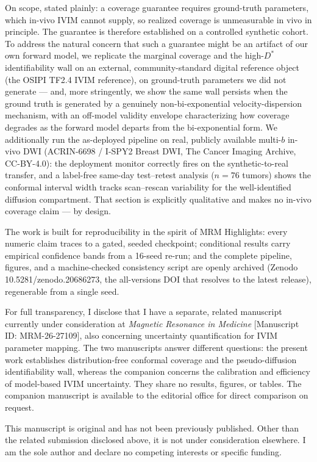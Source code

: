 \documentclass[11pt]{article}
\newcommand{\Dstar}{D^{*}}
\begin{document}
On scope, stated plainly: a coverage guarantee requires ground-truth parameters,
which in-vivo IVIM cannot supply, so realized coverage is unmeasurable in vivo in
principle. The guarantee is therefore established on a controlled synthetic cohort.
To address the natural concern that such a guarantee might be an artifact of our own
forward model, we replicate the marginal coverage and the high-$\Dstar$
identifiability wall on an external, community-standard digital reference object
(the OSIPI TF2.4 IVIM reference), on ground-truth parameters we did not generate ---
and, more stringently, we show the same wall persists when the ground truth is
generated by a genuinely non-bi-exponential velocity-dispersion mechanism, with an
off-model validity envelope characterizing how coverage degrades as the forward
model departs from the bi-exponential form. We additionally run the as-deployed
pipeline on real, publicly available multi-$b$ in-vivo DWI (ACRIN-6698 / I-SPY2
Breast DWI, The Cancer Imaging Archive, CC-BY-4.0): the deployment monitor correctly
fires on the synthetic-to-real transfer, and a label-free same-day test--retest
analysis ($n = 76$ tumors) shows the conformal interval width tracks scan--rescan
variability for the well-identified diffusion compartment. That section is
explicitly qualitative and makes no in-vivo coverage claim --- by design.

The work is built for reproducibility in the spirit of MRM Highlights: every numeric
claim traces to a gated, seeded checkpoint; conditional results carry empirical
confidence bands from a 16-seed re-run; and the complete pipeline, figures, and a
machine-checked consistency script are openly archived (Zenodo
10.5281/zenodo.20686273, the all-versions DOI that resolves to the latest
release), regenerable from a single seed.

For full transparency, I disclose that I have a separate, related manuscript
currently under consideration at \emph{Magnetic Resonance in Medicine} [Manuscript
ID: MRM-26-27109], also concerning uncertainty quantification for IVIM parameter
mapping. The two manuscripts answer different questions: the present work establishes
distribution-free conformal coverage and the pseudo-diffusion identifiability wall,
whereas the companion concerns the calibration and efficiency of model-based IVIM
uncertainty. They share no results, figures, or tables. The companion manuscript is
available to the editorial office for direct comparison on request.

This manuscript is original and has not been previously published. Other than the
related submission disclosed above, it is not under consideration elsewhere. I am
the sole author and declare no competing interests or specific funding.
\end{document}
